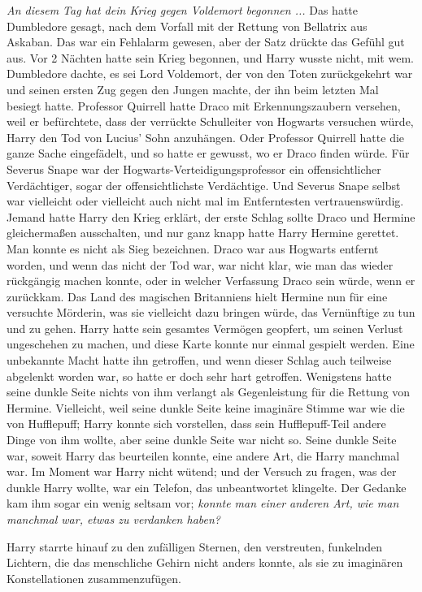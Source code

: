 \emph{An diesem Tag hat dein Krieg gegen Voldemort begonnen ...} Das hatte
Dumbledore gesagt, nach dem Vorfall mit der Rettung von Bellatrix aus Askaban.
Das war ein Fehlalarm gewesen, aber der Satz drückte das Gefühl gut aus. Vor 2
Nächten hatte sein Krieg begonnen, und Harry wusste nicht, mit wem. Dumbledore
dachte, es sei Lord Voldemort, der von den Toten zurückgekehrt war und seinen
ersten Zug gegen den Jungen machte, der ihn beim letzten Mal besiegt hatte.
Professor Quirrell hatte Draco mit Erkennungszaubern versehen, weil er
befürchtete, dass der verrückte Schulleiter von Hogwarts versuchen würde, Harry
den Tod von Lucius' Sohn anzuhängen. Oder Professor Quirrell hatte die ganze
Sache eingefädelt, und so hatte er gewusst, wo er Draco finden würde. Für
Severus Snape war der Hogwarts-Verteidigungsprofessor ein offensichtlicher
Verdächtiger, sogar der offensichtlichste Verdächtige. Und Severus Snape selbst
war vielleicht oder vielleicht auch nicht mal im Entferntesten vertrauenswürdig.
Jemand hatte Harry den Krieg erklärt, der erste Schlag sollte Draco und Hermine
gleichermaßen ausschalten, und nur ganz knapp hatte Harry Hermine gerettet. Man
konnte es nicht als Sieg bezeichnen. Draco war aus Hogwarts entfernt worden, und
wenn das nicht der Tod war, war nicht klar, wie man das wieder rückgängig machen
konnte, oder in welcher Verfassung Draco sein würde, wenn er zurückkam. Das Land
des magischen Britanniens hielt Hermine nun für eine versuchte Mörderin, was sie
vielleicht dazu bringen würde, das Vernünftige zu tun und zu gehen. Harry hatte
sein gesamtes Vermögen geopfert, um seinen Verlust ungeschehen zu machen, und
diese Karte konnte nur einmal gespielt werden. Eine unbekannte Macht hatte ihn
getroffen, und wenn dieser Schlag auch teilweise abgelenkt worden war, so hatte
er doch sehr hart getroffen. Wenigstens hatte seine dunkle Seite nichts von ihm
verlangt als Gegenleistung für die Rettung von Hermine. Vielleicht, weil seine
dunkle Seite keine imaginäre Stimme war wie die von Hufflepuff; Harry konnte
sich vorstellen, dass sein Hufflepuff-Teil andere Dinge von ihm wollte, aber
seine dunkle Seite war nicht so. Seine \glqq{}dunkle Seite\grqq{} war, soweit
Harry das beurteilen konnte, eine andere Art, die Harry manchmal war. Im Moment
war Harry nicht wütend; und der Versuch zu fragen, was der \glqq{}dunkle
Harry\grqq{} wollte, war ein Telefon, das unbeantwortet klingelte. Der Gedanke
kam ihm sogar ein wenig seltsam vor; \emph{konnte man einer anderen Art, wie man
manchmal war, etwas zu verdanken haben?}

Harry starrte hinauf zu den zufälligen Sternen, den verstreuten, funkelnden
Lichtern, die das menschliche Gehirn nicht anders konnte, als sie zu imaginären
Konstellationen zusammenzufügen.

